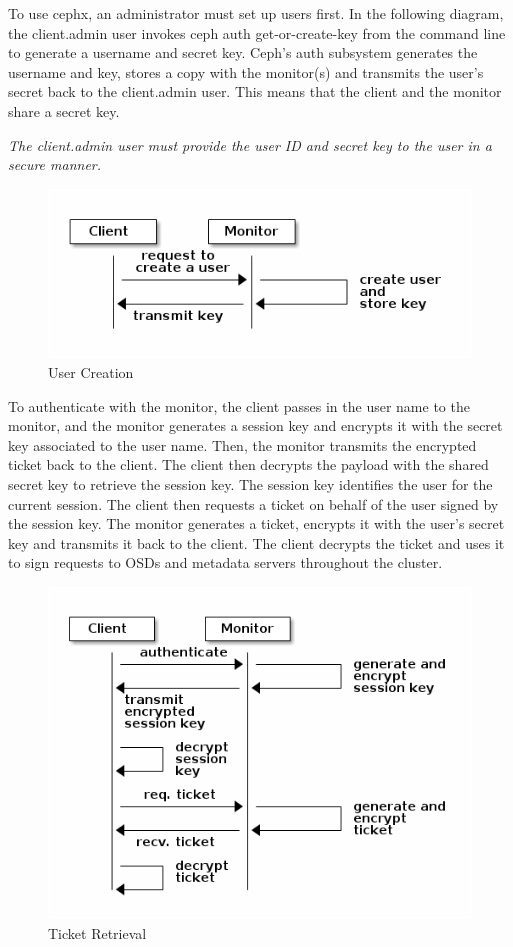\documentclass[12pt,a4paper]{report}
\begin{document}
To use cephx, an administrator must set up users first. In the following
diagram, the client.admin user invokes ceph auth get-or-create-key from the
command line to generate a username and secret key. Ceph’s auth subsystem
generates the username and key, stores a copy with the monitor(s) and transmits
the user’s secret back to the client.admin user. This means that the client and
the monitor share a secret key.

\emph{The client.admin user must provide the user ID and secret key to the user in a
secure manner.}

\begin{figure}[h]
	\includegraphics[scale=0.75]{create_user.png}
	\caption{User Creation}
	\label{fig:create_user}
\end{figure}

To authenticate with the monitor, the client passes in the user name to the
monitor, and the monitor generates a session key and encrypts it with the
secret key associated to the user name. Then, the monitor transmits the
encrypted ticket back to the client. The client then decrypts the payload with
the shared secret key to retrieve the session key. The session key identifies
the user for the current session. The client then requests a ticket on behalf
of the user signed by the session key. The monitor generates a ticket, encrypts
it with the user’s secret key and transmits it back to the client. The client
decrypts the ticket and uses it to sign requests to OSDs and metadata servers
throughout the cluster.

\begin{figure}[h]
	\includegraphics[scale=0.75]{ticket_retrieval.png}
	\caption{Ticket Retrieval}
	\label{fig:ticket_retrieval}
\end{figure}
\end{document}
